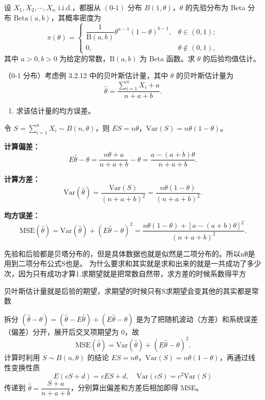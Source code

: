 \begin{homework}[16]
\begin{example}[例 3.2.12（0-1 分布）]
设 $X_1,X_2,\cdots,X_n$ i.i.d.，都服从 $(0\text{-}1)$ 分布 $B(1,\theta)$，$\theta$ 的先验分布为 Beta 分布 $\mathrm{Beta}(a,b)$，其概率密度为
$$
\pi(\theta) = \begin{cases} \dfrac{1}{\mathrm{B}(a,b)}\theta^{a-1}(1-\theta)^{b-1}, & \theta \in (0,1); \\ 0, & \theta \notin (0,1), \end{cases}
$$
其中 $a>0,b>0$ 为给定的常数，$\mathrm{B}(a,b)$ 为 Beta 函数。求 $\theta$ 的后验均值估计。
\end{example}
（0-1 分布）考虑例 3.2.12 中的贝叶斯估计量，其中 $\theta$ 的贝叶斯估计量为
$$
\hat{\theta} = \frac{\sum_{i=1}^n X_i + a}{n + a + b}.
$$
\begin{enumerate}[(1)]
    \item 求该估计量的均方误差。
\end{enumerate}
\end{homework}
\begin{solution}
令 $S = \sum_{i=1}^n X_i \sim B(n,\theta)$，则 $ES = n\theta$，$\mathrm{Var}(S) = n\theta(1-\theta)$。

\textbf{计算偏差：}
$$
E\hat{\theta} - \theta = \frac{n\theta + a}{n+a+b} - \theta = \frac{a-(a+b)\theta}{n+a+b}.
$$

\textbf{计算方差：}
$$
\mathrm{Var}(\hat{\theta}) = \frac{\mathrm{Var}(S)}{(n+a+b)^2} = \frac{n\theta(1-\theta)}{(n+a+b)^2}.
$$

\textbf{均方误差：}
$$
\mathrm{MSE}(\hat{\theta}) = \mathrm{Var}(\hat{\theta}) + \left(E\hat{\theta} - \theta\right)^2 = \frac{n\theta(1-\theta) + \left[a-(a+b)\theta\right]^2}{(n+a+b)^2}.
$$
\end{solution}
\begin{dxtips}
先验和后验都是贝塔分布的，但是具体数据也就是似然是二项分布的。所以nθ是用到二项分布公式S也是。
    为什么要求和其实就是求和出来的就是一共成功了多少次，因为只有成功才算1.求期望就是把常数自然带，求方差的时候系数得平方
\end{dxtips}
\begin{dxtips}
   贝叶斯估计量就是后验的期望，求期望的时候只有S求期望会变其他的其实都是常数
\end{dxtips}
\begin{note}
拆分 $(\hat{\theta} - \theta) = (\hat{\theta} - E\hat{\theta}) + (E\hat{\theta} - \theta)$ 是为了把随机波动（方差）和系统误差（偏差）分开，展开后交叉项期望为 $0$，故
$$
\mathrm{MSE}(\hat{\theta}) = \mathrm{Var}(\hat{\theta}) + (E\hat{\theta} - \theta)^2.
$$
计算时利用 $S \sim B(n,\theta)$ 的结论 $ES = n\theta$，$\mathrm{Var}(S) = n\theta(1-\theta)$，再通过线性变换性质
$$
E(cS+d) = cES+d, \quad \mathrm{Var}(cS) = c^2\mathrm{Var}(S)
$$
传递到 $\hat{\theta} = \dfrac{S+a}{n+a+b}$，分别算出偏差和方差后相加即得 MSE。
\end{note}
